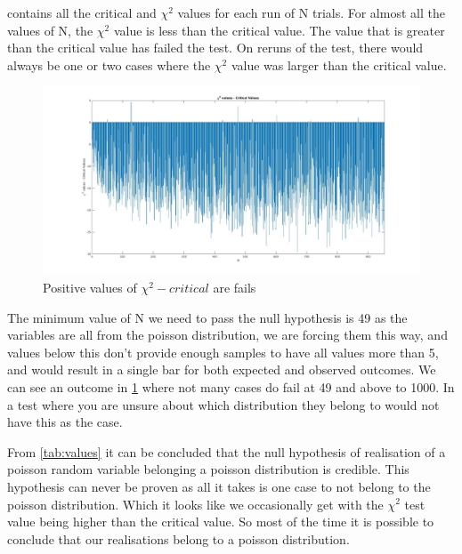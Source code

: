 \documentclass[a4paper, 12pt]{article}
\begin{document}
            \par
             contains all the critical and $\chi^2$ values for each run of N trials. For almost all the values of N, the $\chi^2$ value is less than the critical value. The value that is greater than the critical value has failed the test. On reruns of the test, there would always be one or two cases where the $\chi^2$ value was larger than the critical value. 
            \par
            \begin{figure}[!h]
                \centering
                \includegraphics[width=\columnwidth]{failures.jpg}
                \caption{Positive values of $\chi^2 - critical$ are fails }
                \label{fig:fails}
            \end{figure}
            The minimum value of N we need to pass the null hypothesis is 49 as the variables are all from the poisson distribution, we are forcing them this way, and values below this don't provide enough samples to have all values more than 5, and would result in a single bar for both expected and observed outcomes. We can see an outcome in \cref{fig:fails} where not many cases do fail at 49 and above to 1000. In a test where you are unsure about which distribution they belong to would not have this as the case.
            \par
            From \cref{tab:values} it can be concluded that the null hypothesis of realisation of a poisson random variable belonging a poisson distribution is credible. This hypothesis can never be proven as all it takes is one case to not belong to the poisson distribution. Which it looks like we occasionally get with the $\chi^2$ test value being higher than the critical value. So most of the time it is possible to conclude that our realisations belong to a poisson distribution.
        
\end{document}
